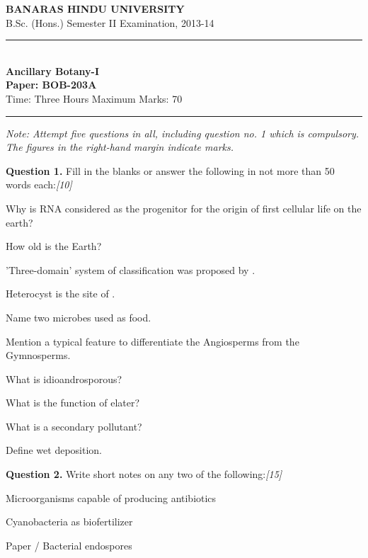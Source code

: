\documentclass[11pt,a4paper]{article}
\newcommand{\pts}[1]{\hfill   \textit{[#1]}}
\begin{document}
\begin{center}
  {\large\bfseries BANARAS HINDU UNIVERSITY}\\[2pt]
  {\normalsize B.Sc. (Hons.) Semester II Examination, 2013-14}\\[6pt]
  \rule{0.8\linewidth}{0.5pt}\\[6pt]
  {\large\bfseries Ancillary Botany-I}\\[4pt]
  {\large\bfseries Paper: BOB-203A}\\[4pt]
  {\normalsize Time: Three Hours \hfill Maximum Marks: 70}
\end{center}

\rule{\linewidth}{0.4pt}

\smallskip



\noindent   \textit{Note: Attempt five questions in all, including question no. 1 which is compulsory. The figures in the right-hand margin indicate marks.}

\bigskip

\medskip


\noindent   \textbf{Question 1.} Fill in the blanks or answer the following in not more than 50 words each:\pts{10}

\begin{parts}
  \item Why is RNA considered as the progenitor for the origin of first cellular life on the earth?
  \item How old is the Earth?
  \item 'Three-domain' system of classification was proposed by \makebox[3cm]{\hrulefill}.
  \item Heterocyst is the site of \makebox[3cm]{\hrulefill}.
  \item Name two microbes used as food.
  \item Mention a typical feature to differentiate the Angiosperms from the Gymnosperms.
  \item What is idioandrosporous?
  \item What is the function of elater?
  \item What is a secondary pollutant?
  \item Define wet deposition.
\end{parts}

\medskip


\noindent   \textbf{Question 2.} Write short notes on any two of the following:\pts{15}

\begin{parts}
  \item Microorganisms capable of producing antibiotics
  \item Cyanobacteria as biofertilizer
  \item Paper / Bacterial endospores
\end{parts}
\end{document}
